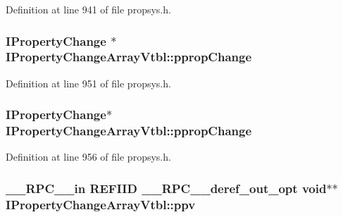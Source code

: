 Definition at line 941 of file propsys.\+h.

\subsubsection[{\texorpdfstring{pprop\+Change}{ppropChange}}]{ {\bf I\+Property\+Change} $\ast$ I\+Property\+Change\+Array\+Vtbl\+::pprop\+Change}\hypertarget{struct_i_property_change_array_vtbl_ab667ed8ebafb75501b17c4e476f2bfbb}{}\label{struct_i_property_change_array_vtbl_ab667ed8ebafb75501b17c4e476f2bfbb}


Definition at line 951 of file propsys.\+h.

\subsubsection[{\texorpdfstring{pprop\+Change}{ppropChange}}]{ {\bf I\+Property\+Change}$\ast$ I\+Property\+Change\+Array\+Vtbl\+::pprop\+Change}\hypertarget{struct_i_property_change_array_vtbl_ae9b4db3ae53a7874d973250817b1369b}{}\label{struct_i_property_change_array_vtbl_ae9b4db3ae53a7874d973250817b1369b}


Definition at line 956 of file propsys.\+h.

\subsubsection[{\texorpdfstring{ppv}{ppv}}]{ {\bf \+\_\+\+\_\+\+R\+P\+C\+\_\+\+\_\+in} {\bf R\+E\+F\+I\+ID} {\bf \+\_\+\+\_\+\+R\+P\+C\+\_\+\+\_\+deref\+\_\+out\+\_\+opt} {\bf void}$\ast$$\ast$ I\+Property\+Change\+Array\+Vtbl\+::ppv}\hypertarget{struct_i_property_change_array_vtbl_a04e36a4df39a73f750c43f381ca896c3}{}\label{struct_i_property_change_array_vtbl_a04e36a4df39a73f750c43f381ca896c3}


